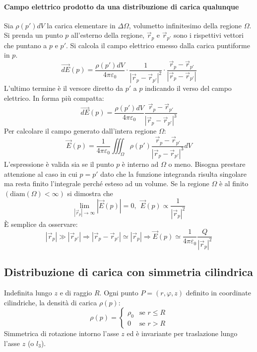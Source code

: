 \paragraph{Campo elettrico prodotto da una distribuzione di carica qualunque}
Sia $\rho(p')dV$ la carica elementare in $\Delta\Omega$, volumetto infinitesimo della regione $\Omega$.
Si prenda un punto $p$ all'esterno della regione, $\vec{r}_p$ e $\vec{r}_{p'}$ sono i rispettivi vettori
che puntano a $p$ e $p'$.
Si calcola il campo elettrico emesso dalla carica puntiforme in $p$.
$$
\vec{dE}(p) = \frac{\rho(p')dV}{4\pi\varepsilon_0}\cdot\frac{1}{|\vec{r}_p-\vec{r}_{p'}|^2} \cdot\frac{\vec{r}_p-\vec{r}_{p'}}{|\vec{r}_p-\vec{r}_{p'}|}
$$
L'ultimo termine è il versore diretto da $p'$ a $p$ indicando il verso del campo elettrico.
In forma più compatta:
$$
\vec{dE}(p) = \frac{\rho(p')dV}{4\pi \varepsilon_0} \frac{\vec{r}_p-\vec{r}_{p'}}{|\vec{r}_p-\vec{r}_{p'}|^3}
$$
Per calcolare il campo generato dall'intera regione $\Omega$:
$$
\vec{E}(p) = \frac{1}{4\pi\varepsilon_0} \iiint_\Omega \rho(p')  \frac{\vec{r}_p-\vec{r}_{p'}}{|\vec{r}_p-\vec{r}_{p'}|^3} dV
$$
L'espressione è valida sia se il punto $p$ è interno ad $\Omega$ o meno. Bisogna prestare attenzione
al caso in cui $p=p'$ dato che la funzione integranda risulta singolare ma resta finito l'integrale
perché esteso ad un volume.
Se la regione $\Omega$ è al finito $(\text{diam}(\Omega)<\infty)$ si dimostra che 
$$
\lim_{|\vec{r}_p| \to \infty} |\vec{E}(p)| = 0,\ \ \vec{E}(p) \propto \frac{1}{|\vec{r}_p|^2}
$$
È semplice da osservare:
$$
|\vec{r}_p| \gg |\vec{r}_{p'}| \Rightarrow |\vec{r}_p -\vec{r}_{p'}| \simeq |\vec{r}_p| \Rightarrow
\vec{E}(p) \simeq \frac{1}{4 \pi \varepsilon_0}\frac{Q}{|\vec{r}_p|^2}
$$

\newpage
\subsection{Distribuzione di carica con simmetria cilindrica}
Indefinita lungo $z$ e di raggio $R$.
Ogni punto $P= (r,\varphi,z)$ definito in coordinate cilindriche, la densità di carica $\rho(p)$:
$$
\rho(p) = \begin{cases}
\rho_0 & \text{se }  r \leq R\\
0 & \text{se }  r > R
\end{cases}
$$
Simmetrica di rotazione intorno l'asse $z$ ed è invariante per traslazione lungo l'asse $z$ (o $l_3$).

